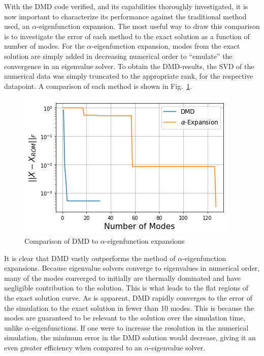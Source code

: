 \documentclass{style/nseJournal}
\newcommand{\LFI}[1]{\label{fi:#1}}
\newcommand{\FI}[1]{Fig.~\ref{fi:#1}}
\newcommand{\bfg}{\begin{figure}}
\newcommand{\efg}{\end{figure}}
\begin{document}
With the DMD code verified, and its capabilities thoroughly investigated, it is now important to characterize its performance against the traditional method used, an $\alpha$-eigenfunction expansion.  
The most useful way to draw this comparison is to investigate the error of each method to the exact solution as a function of number of modes.  
For the $\alpha$-eigenfunction expansion, modes from the exact solution are simply added in decreasing numerical order to ``emulate'' the convergence in an eigenvalue solver.  
To obtain the DMD-results, the SVD of the numerical data was simply truncated to the appropriate rank, for the respective datapoint.  
A comparison of each method is shown in \FI{comp}.  
\bfg[!htb] \centering
\includegraphics[scale=0.5]{figures/method_comparison.png}
	\caption{Comparison of DMD to $\alpha$-eigenfunction expansions}
	\LFI{comp}
\efg

It is clear that DMD vastly outperforms the method of $\alpha$-eigenfunction expansions.  
Because eigenvalue solvers converge to eigenvalues in numerical order, many of the modes converged to initially are thermally dominated and have negligible contribution to the solution.  
This is what leads to the flat regions of the exact solution curve.  
As is apparent, DMD rapidly converges to the error of the simulation to the exact solution in fewer than 10 modes.  
This is because the modes are guaranteed to be relevant to the solution over the simulation time, unlike $\alpha$-eigenfunctions.  
If one were to increase the resolution in the numerical simulation, the minimum error in the DMD solution would decrease, giving it an even greater efficiency when compared to an $\alpha$-eigenvalue solver.  
\end{document}
